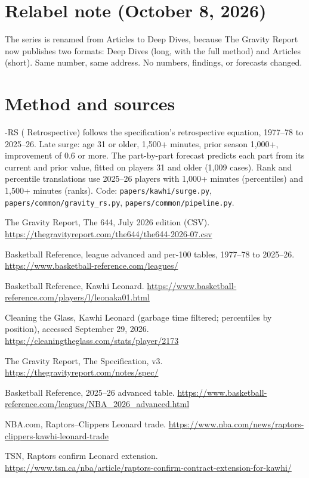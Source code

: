 \documentclass[11pt]{article}
\begin{document}
\medskip\noindent{\footnotesize\textcolor{steel}{Public-stat bets are graded on Basketball Reference's final regular-season
tables by April 30, 2027. Registered October 6, 2026. Scored by Brier score in the
Forecast Ledger.}}

\section*{Relabel note (October 8, 2026)}
The series is renamed from Articles to Deep Dives, because The Gravity Report now publishes two
formats: Deep Dives (long, with the full method) and Articles (short). Same number, same address.
No numbers, findings, or forecasts changed.

\section*{Method and sources}
\small
\gravity-RS (\gravity{} Retrospective) follows the specification's retrospective equation,
1977--78 to 2025--26. Late surge: age 31 or older, 1,500+ minutes, prior season 1,000+, improvement
of 0.6 or more. The part-by-part forecast predicts each part from its current and prior value,
fitted on players 31 and older (1,009 cases). Rank and percentile translations use 2025--26
players with 1,000+ minutes (percentiles) and 1,500+ minutes (ranks). Code:
\texttt{papers/kawhi/surge.py}, \texttt{papers/common/gravity\_rs.py},
\texttt{papers/common/pipeline.py}.
\begin{enumerate}[label={[\arabic*]}]
\item The Gravity Report, The 644, July 2026 edition (CSV). \url{https://thegravityreport.com/the644/the644-2026-07.csv}
\item Basketball Reference, league advanced and per-100 tables, 1977--78 to 2025--26. \url{https://www.basketball-reference.com/leagues/}
\item Basketball Reference, Kawhi Leonard. \url{https://www.basketball-reference.com/players/l/leonaka01.html}
\item Cleaning the Glass, Kawhi Leonard (garbage time filtered; percentiles by position), accessed September 29, 2026. \url{https://cleaningtheglass.com/stats/player/2173}
\item The Gravity Report, The \gravity{} Specification, v3. \url{https://thegravityreport.com/notes/spec/}
\item Basketball Reference, 2025--26 advanced table. \url{https://www.basketball-reference.com/leagues/NBA_2026_advanced.html}
\item NBA.com, Raptors--Clippers Leonard trade. \url{https://www.nba.com/news/raptors-clippers-kawhi-leonard-trade}
\item TSN, Raptors confirm Leonard extension. \url{https://www.tsn.ca/nba/article/raptors-confirm-contract-extension-for-kawhi/}
\end{enumerate}
\end{document}

